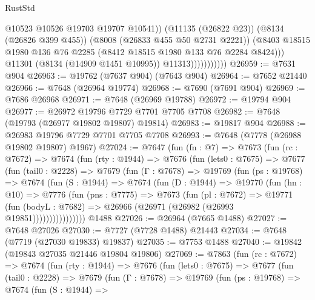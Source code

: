 \begin{lexlean}{RustStd}
\begin{coremodule}
                                @10523
                                @10526
                                @19703
                                @19707
                                @10541))
                            (@11135 (@26822 @23))
                            (@8134 (@26826 @399 @455))
                            (@8008 (@26833 @455 @50 @2731 @2221))
                            (@8403
                              @18515
                              @1980
                              @136
                              @76
                              @2285
                              (@8412 @18515 @1980 @133 @76 @2284 @8424)))
                          @11301
                          (@8134 (@14909 @1451 @10995))
                          @11313)))))))))))
@26959 := @7631 @904
@26963 := @19762 (@7637 @904) (@7643 @904)
@26964 := @7652 @21440
@26966 := @7648 (@26964 @19774)
@26968 := @7690 (@7691 @904)
@26969 := @7686 @26968
@26971 := @7648 (@26969 @19788)
@26972 := @19794 @904
@26977 := @26972 @19796 @7729 @7701 @7705 @7708
@26982 := @7648 (@19793 (@26977 @19802 @19807) @19814)
@26983 := @19817 @904
@26988 := @26983 @19796 @7729 @7701 @7705 @7708
@26993 := @7648 (@7778 (@26988 @19802 @19807) @1967)
@27024 := @7647
    (fun (fn : @7) =>
    @7673
      (fun (rc : @7672) =>
      @7674
        (fun (rty : @1944) =>
        @7676
          (fun (lets0 : @7675) =>
          @7677
            (fun (tail0 : @2228) =>
            @7679
              (fun (Γ : @7678) =>
              @19769
                (fun (ps : @19768) =>
                @7674
                  (fun (S : @1944) =>
                  @7674
                    (fun (D : @1944) =>
                    @19770
                      (fun (hn : @10) =>
                      @7776
                        (fun (pns : @7775) =>
                        @7673
                          (fun (pl : @7672) =>
                          @19771
                            (fun (bodyL : @7682) =>
                            @26966 (@26971 (@26982 (@26993 @19851))))))))))))))))
    @1488
@27026 := @26964 (@7665 @1488)
@27027 := @7648 @27026
@27030 := @7727 (@7728 @1488) @21443
@27034 := @7648 (@7719 (@27030 @19833) @19837)
@27035 := @7753 @1488
@27040 := @19842 (@19843 @27035 @21446 @19804 @19806)
@27069 := @7863
    (fun (rc : @7672) =>
    @7674
      (fun (rty : @1944) =>
      @7676
        (fun (lets0 : @7675) =>
        @7677
          (fun (tail0 : @2228) =>
          @7679
            (fun (Γ : @7678) =>
            @19769
              (fun (ps : @19768) =>
              @7674
                (fun (S : @1944) =>

\end{coremodule}
\end{lexlean}
